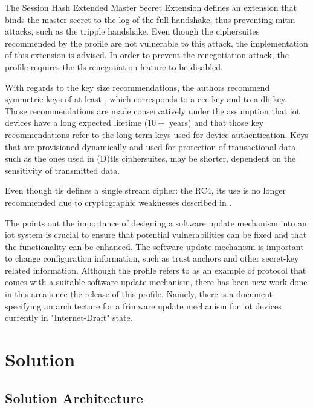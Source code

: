 \documentclass{llncs}
\begin{document}
The Session Hash Extended Master Secret Extension \cite{RFC7627} defines an extension
that binds the master secret to the log of the full handshake, thus preventing
\gls{mitm} attacks, such as the tripple handshake\cite{TripleHa89:online}. Even though the
ciphersuites recommended by the profile are not vulnerable to this attack, the
implementation of this extension is advised. In order to prevent the renegotiation
attack\cite{RFC5746}, the profile requires the \gls{tls} renegotiation feature
to be disabled.

With regards to the key size recommendations, the authors recommend symmetric keys
of at least , which corresponds to a  \gls{ecc}
key and to a  \gls{dh} key. Those recommendations are made
conservatively under the assumption that \gls{iot} devices have a long expected
lifetime ($10+$ years) and that those key recommendations refer to the long-term
keys used for device authentication. Keys that are provisioned dynamically
and used for protection of transactional data, such as the ones used in
(D)\gls{tls} ciphersuites, may be shorter, dependent on the sensitivity of
transmitted data.

Even though \gls{tls} defines a single stream cipher: the RC4, its use is no longer
recommended due to cryptographic weaknesses described in \cite{RFC7465}.

The \cite{RFC7925} points out the importance of designing a software
update mechanism into an \gls{iot} system is crucial to ensure that potential vulnerabilities
can be fixed and that the functionality can be enhanced. The software update mechanism
is important to change configuration information, such as trust anchors and
other secret-key related information. Although the profile refers to \cite{OpenMobi29:online}
as an example of protocol that comes with a suitable software update mechanism,
there has been new work done in this area since the release of this profile.
Namely, there is a document specifying an architecture for a frimware update
mechanism for \gls{iot} devices\cite{I-D.moran-suit-architecture} currently in "Internet-Draft" state.

\section{Solution}

\subsection{Solution Architecture}
\end{document}
